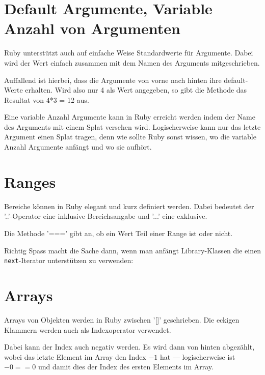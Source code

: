 \documentclass[a4book,11pt,twoside]{scrbook}
\begin{document}
\section{Default Argumente, Variable Anzahl von Argumenten}
Ruby unterstützt auch auf einfache Weise Standardwerte für Argumente. Dabei wird der Wert einfach zusammen mit dem Namen des Arguments mitgeschrieben.



Auffallend ist hierbei, dass die Argumente von vorne nach hinten ihre default-Werte erhalten. Wird also nur 4 als Wert angegeben, so gibt die Methode das Resultat von 4*3 = 12 aus.


Eine variable Anzahl Argumente kann in Ruby erreicht werden indem der Name des Arguments mit einem Splat versehen wird. Logischerweise kann nur das letzte Argument einen Splat tragen, denn wie sollte Ruby sonst wissen, wo die variable Anzahl Argumente anfängt und wo sie aufhört.









\section{Ranges}
Bereiche können in Ruby elegant und kurz definiert werden. Dabei bedeutet der '..'-Operator eine inklusive Bereichsangabe und '...' eine exklusive.

Die Methode '===' gibt an, ob ein Wert Teil einer Range ist oder nicht.




Richtig Spass macht die Sache dann, wenn man anfängt Library-Klassen die einen \texttt{next}-Iterator unterstützen zu verwenden:







\section{Arrays} %
\label{sec:arrays}
Arrays von Objekten werden in Ruby zwischen '[]' geschrieben. Die eckigen Klammern werden auch als Indexoperator verwendet.

Dabei kann der Index auch negativ werden. Es wird dann von hinten abgezählt, wobei das letzte Element im Array den Index $-1$ hat — logischerweise ist $-0 == 0$ und damit dies der Index des ersten Elements im Array.
\end{document}
